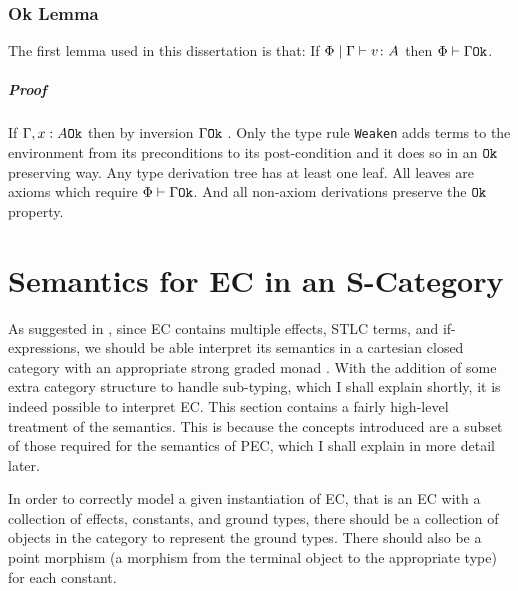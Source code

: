 \documentclass{Report}
\begin{document}
\subsection{Ok Lemma} The first lemma used in this dissertation is that: If $\Phi\mid\Gamma \vdash v \colon A$ then $\Phi\vdash \Gamma \texttt{Ok}$.
\paragraph{Proof}
If $\Gamma, x: A \texttt{Ok}$ then by inversion $\Gamma \texttt{Ok}$ .
Only the type rule \texttt{Weaken} adds terms to the environment from its preconditions to its post-condition and it does so in an $\texttt{Ok}$ preserving way. Any type derivation tree has at least one leaf. All leaves are axioms which require $\Phi\vdash \Gamma \texttt{Ok}$. And all non-axiom derivations preserve the $\texttt{Ok}$ property.


\chapter{Semantics for EC in an S-Category}

As suggested in , since EC contains multiple effects, STLC terms, and if-expressions, we should be able interpret its semantics in a cartesian closed category with an appropriate strong graded monad . With the addition of some extra category structure to handle sub-typing, which I shall explain shortly, it is indeed possible to interpret EC. This section contains a fairly high-level treatment of the semantics. This is because the concepts introduced are a subset of those required for the semantics of PEC, which I shall explain in more detail later.


In order to correctly model a given instantiation of EC, that is an EC with a collection of effects, constants, and ground types, there should be a collection of objects in the category to represent the ground types. There should also be a point morphism (a morphism from the terminal object to the appropriate type) for each constant.
\end{document}
